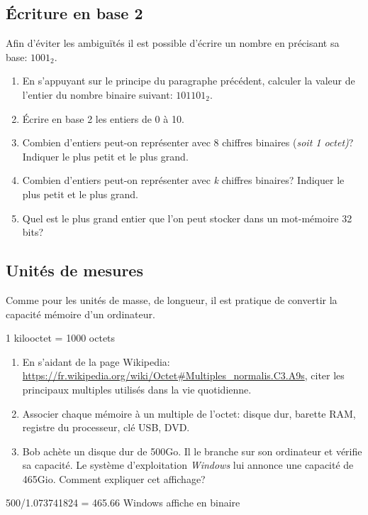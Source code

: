 \documentclass[a4paper,11pt]{article}
\begin{document}
\begin{Form}
\subsection{Écriture en base 2}
Afin d'éviter les ambiguïtés il est possible d'écrire un nombre en précisant sa base: $1001_2$.
\begin{activite}
\begin{enumerate}
\item En s'appuyant sur le principe du paragraphe précédent, calculer la valeur de l'entier du nombre binaire suivant: $101101_2$.
\item Écrire en base 2 les entiers de 0 à 10.
\item Combien d'entiers peut-on représenter avec 8 chiffres binaires (\emph{soit 1 octet)}? Indiquer le plus petit et le plus grand.
\item Combien d'entiers peut-on représenter avec \emph{k} chiffres binaires? Indiquer le plus petit et le plus grand.
\item Quel est le plus grand entier que l'on peut stocker dans un mot-mémoire 32 bits?
\end{enumerate}
\end{activite}
\subsection{Unités de mesures}
Comme pour les unités de masse, de longueur, il est pratique de convertir la capacité mémoire d'un ordinateur.
\begin{center}
1 kilooctet = 1000 octets
\end{center}
\begin{activite}
\begin{enumerate}
\item En s'aidant de la page Wikipedia: \url{https://fr.wikipedia.org/wiki/Octet#Multiples_normalis.C3.A9s}, citer les principaux multiples utilisés dans la vie quotidienne.
\item Associer chaque mémoire à un multiple de l'octet: disque dur, barette RAM, registre du processeur, clé USB, DVD.
\item Bob achète un disque dur de 500Go. Il le branche sur son ordinateur et vérifie sa capacité. Le système d'exploitation \emph{Windows} lui annonce une capacité de 465Gio. Comment expliquer cet affichage?
\end{enumerate}
\end{activite}
\begin{commentprof}
500/1.073741824 = 465.66 Windows affiche en binaire
\end{commentprof}

\end{Form}
\end{document}
